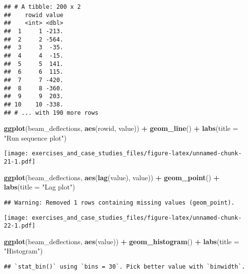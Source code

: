 \documentclass[]{book}
\newenvironment{Shaded}{\begin{snugshade}}{\end{snugshade}}
\newcommand{\DataTypeTok}[1]{\textcolor[rgb]{0.13,0.29,0.53}{#1}}
\newcommand{\KeywordTok}[1]{\textcolor[rgb]{0.13,0.29,0.53}{\textbf{#1}}}
\newcommand{\NormalTok}[1]{#1}
\newcommand{\OperatorTok}[1]{\textcolor[rgb]{0.81,0.36,0.00}{\textbf{#1}}}
\newcommand{\StringTok}[1]{\textcolor[rgb]{0.31,0.60,0.02}{#1}}
\theoremstyle{definition}
\theoremstyle{definition}
\theoremstyle{definition}
\theoremstyle{remark}
\begin{document}
\begin{verbatim}
## # A tibble: 200 x 2
##    rowid value
##    <int> <dbl>
##  1     1 -213.
##  2     2 -564.
##  3     3  -35.
##  4     4  -15.
##  5     5  141.
##  6     6  115.
##  7     7 -420.
##  8     8 -360.
##  9     9  203.
## 10    10 -338.
## # ... with 190 more rows
\end{verbatim}

\begin{Shaded}
\begin{Highlighting}[]
\KeywordTok{ggplot}\NormalTok{(beam_deflections, }\KeywordTok{aes}\NormalTok{(rowid, value)) }\OperatorTok{+}
\StringTok{  }\KeywordTok{geom_line}\NormalTok{() }\OperatorTok{+}
\StringTok{  }\KeywordTok{labs}\NormalTok{(}\DataTypeTok{title =} \StringTok{"Run sequence plot"}\NormalTok{)}
\end{Highlighting}
\end{Shaded}

\texttt{[image: exercises\_and\_case\_studies\_files/figure-latex/unnamed-chunk-21-1.pdf]}

\begin{Shaded}
\begin{Highlighting}[]
\KeywordTok{ggplot}\NormalTok{(beam_deflections, }\KeywordTok{aes}\NormalTok{(}\KeywordTok{lag}\NormalTok{(value), value)) }\OperatorTok{+}
\StringTok{  }\KeywordTok{geom_point}\NormalTok{() }\OperatorTok{+}
\StringTok{  }\KeywordTok{labs}\NormalTok{(}\DataTypeTok{title =} \StringTok{"Lag plot"}\NormalTok{)}
\end{Highlighting}
\end{Shaded}

\begin{verbatim}
## Warning: Removed 1 rows containing missing values (geom_point).
\end{verbatim}

\texttt{[image: exercises\_and\_case\_studies\_files/figure-latex/unnamed-chunk-22-1.pdf]}

\begin{Shaded}
\begin{Highlighting}[]
\KeywordTok{ggplot}\NormalTok{(beam_deflections, }\KeywordTok{aes}\NormalTok{(value)) }\OperatorTok{+}
\StringTok{  }\KeywordTok{geom_histogram}\NormalTok{() }\OperatorTok{+}
\StringTok{  }\KeywordTok{labs}\NormalTok{(}\DataTypeTok{title =} \StringTok{"Histogram"}\NormalTok{)}
\end{Highlighting}
\end{Shaded}

\begin{verbatim}
## `stat_bin()` using `bins = 30`. Pick better value with `binwidth`.
\end{verbatim}
\end{document}
